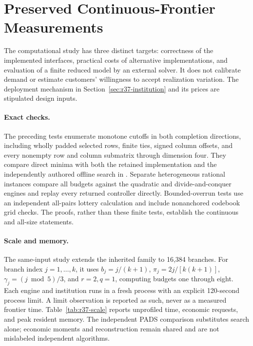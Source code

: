 \section{Preserved Continuous-Frontier Measurements}\label{ec:legacy-evidence}
The computational study has three distinct targets: correctness of the implemented interfaces, practical costs of alternative implementations, and evaluation of a finite reduced model by an external solver. It does not calibrate demand or estimate customers' willingness to accept realization variation. The deployment mechanism in Section~\ref{sec:r37-institution} and its prices are stipulated design inputs.

\paragraph{Exact checks.}
The preceding tests enumerate monotone cutoffs in both completion directions, including wholly padded selected rows, finite ties, signed column offsets, and every nonempty row and column submatrix through dimension four. They compare direct minima with both the retained implementation and the independently authored offline search in \citet{EppsteinPADS}. Separate heterogeneous rational instances compare all budgets against the quadratic and divide-and-conquer engines and replay every returned controller directly. Bounded-overrun tests use an independent all-pairs lottery calculation and include nonanchored codebook grid checks. The proofs, rather than these finite tests, establish the continuous and all-size statements.



\paragraph{Scale and memory.}
The same-input study extends the inherited family to 16,384 branches. For branch index $j=1,\ldots,k$, it uses $b_j=j/(k+1)$, $\pi_j=2j/[k(k+1)]$, $\gamma_j=(j\bmod5)/3$, and $r=2,q=1$, computing budgets one through eight. Each engine and institution runs in a fresh process with an explicit 120-second process limit. A limit observation is reported as such, never as a measured frontier time. Table~\ref{tab:r37-scale} reports unprofiled time, economic requests, and peak resident memory. The independent PADS comparison substitutes search alone; economic moments and reconstruction remain shared and are not mislabeled independent algorithms.

